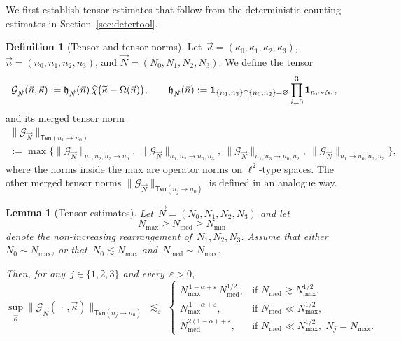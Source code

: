 \documentclass[11pt,reqno,english]{amsart}
\numberwithin{equation}{section}
\theoremstyle{plain}
\newtheorem{lemma}[theorem]{Lemma}
\theoremstyle{definition}
\newtheorem{definition}[theorem]{Definition}
\theoremstyle{remark}
\renewcommand{\epsilon}{\varepsilon}
\begin{document}
We first establish tensor estimates that follow from the deterministic counting estimates in Section~\ref{sec:detertool}.

\begin{definition}[Tensor and tensor norms] \label{def:tens}
	Let~$\vec{\kappa}=(\kappa_{0},\kappa_{1},\kappa_{2},\kappa_{3})$,
	$\vec{n}=(n_{0},n_{1},n_{2},n_{3})$, and
	$\vec{N}=(N_{0},N_{1},N_{2},N_{3})$.
	We define the tensor
	\[
    \hspace{-15pt}\mathcal{G}_{\vec N}(\vec{n},\vec{\kappa})
	:=\mathfrak{h}_{\vec{N}}(\vec n)\,
	\widehat{\chi}\big(\widetilde{\kappa}-\Omega(\vec n)\big),
	\qquad
	\mathfrak{h}_{\vec{N}}(\vec n)
	:=\mathbf{1}_{\{n_{1},n_{3}\}\cap\{n_{0},n_{2}\}=\varnothing}
	\prod_{i=0}^{3}\mathbf{1}_{n_{i}\sim N_{i}},
	\]
	and its merged tensor norm
	\begin{multline*}
	\|\mathcal{G}_{\vec{N}}\|_{\mathsf{Ten}(n_{1}\to n_{0})}
\\
    :=\max\Big\{
	\|\mathcal{G}_{\vec{N}}\|_{n_{1},n_{2},n_{3}\to n_{0}},\
	\|\mathcal{G}_{\vec{N}}\|_{n_{1},n_{2}\to n_{0},n_{3}},\
	\|\mathcal{G}_{\vec{N}}\|_{n_{1},n_{3}\to n_{0},n_{2}},\
	\|\mathcal{G}_{\vec{N}}\|_{n_{1}\to n_{0},n_{2},n_{3}}
	\Big\},
	\end{multline*}
where the norms inside the max are operator norms on $\ell^2$-type spaces.
The other merged tensor norms $\|\mathcal{G}_{\vec{N}}\|_{\mathsf{Ten}(n_j\to n_0) }$ is defined in an analogue way. 
\end{definition}


	\begin{lemma}[Tensor estimates]\label{lem:tens}
		Let~$\vec N=(N_0,N_1,N_2,N_3)$ and let
		\[
		N_{\max}\ge N_{\mathrm{med}}\ge N_{\min}
		\]
		denote the non-increasing rearrangement of~$N_1,N_2,N_3$.
		Assume that either~$N_0\sim N_{\max}$, or that~$N_0\lesssim N_{\max}$ and~$N_{\mathrm{med}}\sim N_{\max}$.
		
		Then, for any~$j\in\{1,2,3\}$ and every~$\varepsilon>0$,
		\[
		\sup_{\vec\kappa}
		\|\mathcal G_{\vec N}(\,\cdot\,,\vec\kappa)\|_{\mathsf{Ten}(n_{j}\to n_{0})}
		\;\lesssim_{\varepsilon}\;
		\begin{cases}
			N_{\max}^{\,1-\alpha+\varepsilon}\,N_{\mathrm{med}}^{1/2},
			& \text{if } N_{\mathrm{med}}\gtrsim N_{\max}^{1/2},\\[0.2cm]
			N_{\mathrm{max}}^{\,1-\alpha+\varepsilon},
			& \text{if } N_{\mathrm{med}}\ll N_{\max}^{1/2},\\[0.2cm]
			N_{\mathrm{med}}^{2(1-\alpha)+\epsilon}, &\text{if } N_{\mathrm{med}}\ll N_{\max}^{1/2},\; N_j=N_{\max}.
		\end{cases}
		\]
	\end{lemma}
	
\end{document}
